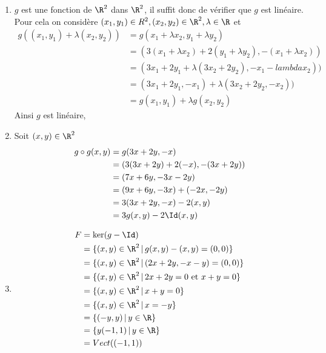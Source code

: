 \begin{correction}
\begin{enumerate}
\item $g$ est une fonction de $\R^2$ dans $\R^2$, il suffit donc de vérifier que $g$ est linéaire. Pour cela on considère $(x_1,y_1)\in R^2,(x_2,y_2) \in \R^2, \lambda \in \R$ et 
\begin{align*}
g( (x_1,y_1) + \lambda (x_2,y_2))& = g( x_1 +\lambda x_2 , y_1 +\lambda y_2) \\
												&= (3(x_1 +\lambda x_2)  +2 (y_1 +\lambda y_2) , - (x_1 +\lambda x_2)) \\
												&= (3x_1 + 2y_1 +\lambda (3 x_2 +2y_2),  -x_1 -lambda x_2))\\
												&= (3x_1 + 2y_1, -x_1) +  \lambda (3 x_2 +2y_2,  -x_2))\\
												&= g(x_1,y_1) +\lambda g(x_2,y_2)
\end{align*}
Ainsi $g$ est linéaire, 
\item Soit $(x,y)\in \R^2$ 
\begin{align*}
g\circ g(x,y) &=g(3x+2y,-x)\\
					&= (3 (3x+2y) +2 (-x) , - (3x+2y))\\
					&=( 7x +6y, -3x-2y)\\
					&= (9x+6y, -3x) + (-2x,-2y)\\
					&= 3 (3x+2y,-x) -2(x,y)\\
					&= 3 g(x,y) - 2\Id (x,y)
\end{align*}

\item 
\begin{align*}
F&=\ker( g-\Id)\\
  &= \{ (x,y)\in \R^2\, |\, g(x,y)-(x,y) =(0,0)\}\\
  &= \{ (x,y)\in \R^2\, |\, (2x+2y,-x-y) =(0,0)\}\\
  &= \{ (x,y)\in \R^2\, |\, 2x+2y=0 \text{ et } x+y = 0 \}\\
  &= \{ (x,y)\in \R^2\, |\, x+y=0\}\\
  &= \{ (x,y)\in \R^2\, |\, x=-y\}\\
  &= \{ (-y,y)\, |\,y \in \R\}\\
  &=\{ y(-1,1)\, |\,y \in \R\}\\
  &= Vect(( -1,1))
\end{align*}


\end{enumerate}
\end{correction}
